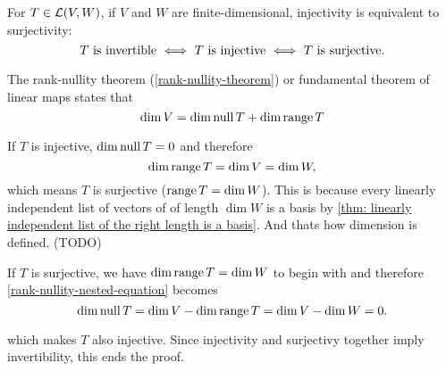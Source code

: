   \setcounter{thm}{64}
  \begin{thm} 
    \label{thm: injectivity is equivalent to surjectivity}
    For $T\in \mathcal{L}(V,W)$, if $V$ and $W$ are finite-dimensional, injectivity is equivalent to surjectivity:
    \begin{equation}
        T$ is invertible $\iff$ $T$ is injective $\iff$ $T$ is surjective.$
    \end{equation}
  \end{thm}
  \begin{prf}
    The rank-nullity theorem (\ref{rank-nullity-theorem}) or fundamental theorem of linear maps states that
    \begin{equation}
      \label{rank-nullity-nested-equation}
      \dim V = \dim \operatorname{null} T + \dim \operatorname{range} T
    \end{equation}

    If $T$ is injective, $\dim \operatorname{null} T = 0$ and therefore
    \begin{equation}
      \dim \operatorname{range} T = \dim V = \dim W,
    \end{equation}
    which means $T$ is surjective ($\operatorname{range} T = \dim W$). This is because every linearly independent list of vectors of of length $\dim W$ is a basis by
    \ref{thm: linearly independent list of the right length is a basis}. And thats how dimension is defined. (TODO)

    If $T$ is surjective, we have $\dim \operatorname{range} T = \dim W$ to begin with and therefore \eqref{rank-nullity-nested-equation} becomes
    \begin{equation}
      \dim \operatorname{null} T = \dim V - \dim \operatorname{range} T = \dim V - \dim W = 0.
    \end{equation}

    which makes $T$ also injective.
    Since injectivity and surjectivy together imply invertibility, this ends the proof.
  \end{prf}


